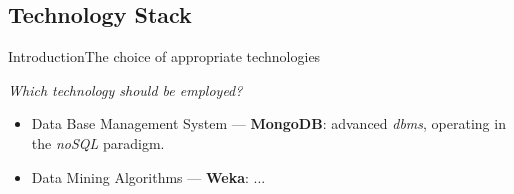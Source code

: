 \subsection{Technology Stack}
\begin{frame}{Introduction}{The choice of appropriate technologies}

	\centering\textit{Which technology should be employed?} \vspace{0,3cm}

	\begin{block}{}
	    \begin{itemize}
		    \item<1-> \alert{Data Base Management System} --- \textbf{MongoDB}: advanced \emph{dbms}, operating in the \emph{noSQL} paradigm.
		    \item<2-> \alert{Data Mining Algorithms} --- \textbf{Weka}: ...
	    \end{itemize}
    \end{block}

\end{frame}
